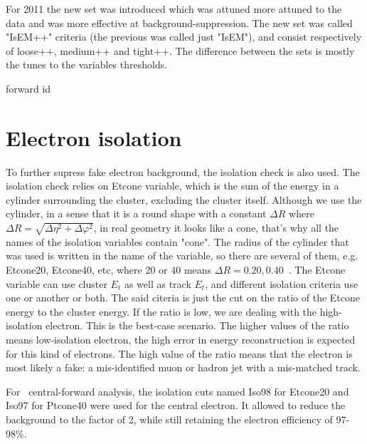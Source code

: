 For 2011 the new set was introduced which was attuned more attuned to the data and was more effective at background-suppression. The new set was called "IsEM++" criteria (the previous was called just "IsEM"), and consist respectively of loose++, medium++ and tight++. The difference between the sets is mostly the tunes to the variables thresholds.

\tbu forward id

\begin{figure}
\end{figure}

\section{Electron isolation}
\label{sec:Rec_eleciso}

To further supress fake electron background, the isolation check is also used. The isolation check relies on Etcone variable, which is the sum of the energy in a cylinder surrounding the cluster, excluding the cluster itself. Although we use the cylinder, in a sense that it is a round shape with a constant $\Delta R$ where $\Delta R = \sqrt{\Delta\eta^{2} + \Delta\varphi^{2}}$, in real geometry it looks like a cone, that's why all the names of the isolation variables contain "cone".  The radius of the cylinder that was used is written in the name of the variable, so there are several of them, e.g. Etcone20, Etcone40, etc, where 20 or 40 means $\Delta R = 0.20 , 0.40$~\cite{lib:reco_iso}. The Etcone variable can use cluster $E_{t}$ as well as track $E_{t}$, and different isolation criteria use one or another or both. The said citeria is just the cut on the ratio of the Etcone energy to the cluster energy. If the ratio is low, we are dealing with the high-isolation electron. This is the best-case scenario. The higher values of the ratio means low-isolation electron, the high error in energy reconstruction is expected for this kind of electrons. The high value of the ratio means that the electron is most likely a fake: a mis-identified muon or hadron jet with a mis-matched track.

For \Zee\ central-forward analysis, the isolation cuts named Iso98 for Etcone20 and Iso97 for Ptcone40 were used for the central electron. It allowed to reduce the background to the factor of 2, while still retaining the electron efficiency of 97-98\%.
